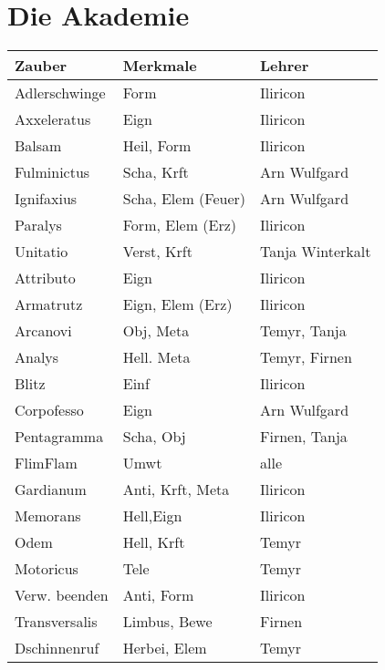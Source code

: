 \section{Die Akademie}

\begin{tabular}{l|l|l}
Zauber &  Merkmale &  Lehrer\\\hline
Adlerschwinge &  Form &  Iliricon\\
Axxeleratus &  Eign &  Iliricon\\
Balsam &  Heil, Form &  Iliricon\\
Fulminictus  &  Scha, Krft &  Arn Wulfgard\\
Ignifaxius  &  Scha, Elem (Feuer) &  Arn Wulfgard\\
Paralys &  Form, Elem (Erz) &  Iliricon\\
Unitatio &  Verst, Krft &  Tanja Winterkalt\\
Attributo &  Eign &  Iliricon \\
Armatrutz  &  Eign, Elem (Erz) &  Iliricon \\
Arcanovi  &  Obj, Meta &  Temyr, Tanja\\
Analys &  Hell. Meta &  Temyr, Firnen\\
Blitz &  Einf &  Iliricon\\
Corpofesso &  Eign &  Arn Wulfgard\\
Pentagramma  &  Scha, Obj &  Firnen, Tanja\\
FlimFlam &  Umwt &  alle\\
Gardianum &  Anti, Krft, Meta &  Iliricon\\
Memorans &  Hell,Eign &  Iliricon \\
Odem &  Hell, Krft &  Temyr\\
Motoricus &  Tele &  Temyr\\
Verw. beenden &  Anti, Form &  Iliricon\\
Transversalis &  Limbus, Bewe &  Firnen\\
Dschinnenruf &  Herbei, Elem &  Temyr
\end{tabular}






